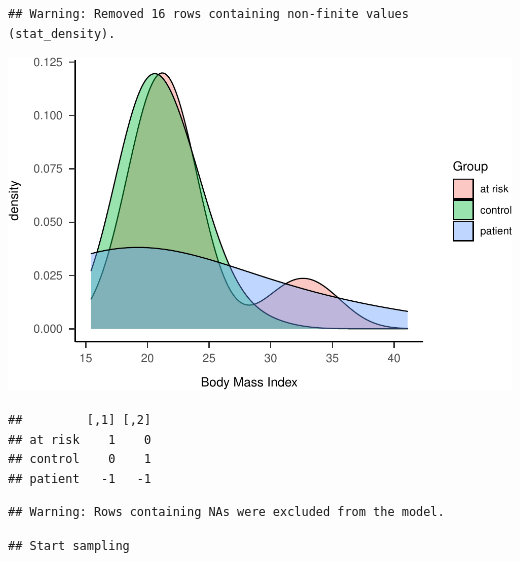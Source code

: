 \documentclass[
]{article}
\begin{document}
\begin{verbatim}
## Warning: Removed 16 rows containing non-finite values (stat_density).
\end{verbatim}

\includegraphics{046_weight_history_alpha_files/figure-latex/unnamed-chunk-9-1.pdf}

\begin{verbatim}
##         [,1] [,2]
## at risk    1    0
## control    0    1
## patient   -1   -1
\end{verbatim}

\begin{verbatim}
## Warning: Rows containing NAs were excluded from the model.
\end{verbatim}

\begin{verbatim}
## Start sampling
\end{verbatim}
\end{document}
